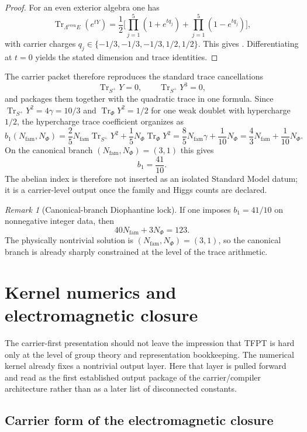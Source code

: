 \documentclass[11pt,a4paper]{article}
\theoremstyle{definition}
\theoremstyle{remark}
\newtheorem*{remark}{Remark}
\DeclareMathOperator{\tr}{Tr}
\newcommand{\bone}{b_1}
\begin{document}
\begin{proof}
For an even exterior algebra one has
\[
\tr_{\Lambda^{\mathrm{even}}E}(e^{tY})
=
\frac12\Big[\prod_{j=1}^5(1+e^{tq_j})+\prod_{j=1}^5(1-e^{tq_j})\Big],
\]
with carrier charges $q_j\in\{-1/3,-1/3,-1/3,1/2,1/2\}$. This gives . Differentiating at $t=0$ yields the stated dimension and trace identities.
\end{proof}

The carrier packet therefore reproduces the standard trace cancellations
\[
\tr_{S^+}Y=0,
\qquad
\tr_{S^+}Y^3=0,
\]
and packages them together with the quadratic trace in one formula. Since $\tr_{S^+}Y^2=4\gamma=10/3$ and $\tr_\Phi Y^2=1/2$ for one weak doublet with hypercharge $1/2$, the hypercharge trace coefficient organizes as
\begin{equation}
\label{eq:abelian-index}
\bone(N_{\mathrm{fam}},N_\Phi)
=
\frac25N_{\mathrm{fam}}\tr_{S^+}Y^2+\frac15N_\Phi\tr_\Phi Y^2
=
\frac85N_{\mathrm{fam}}\gamma+\frac1{10}N_\Phi
=
\frac43N_{\mathrm{fam}}+\frac1{10}N_\Phi.
\end{equation}
On the canonical branch $(N_{\mathrm{fam}},N_\Phi)=(3,1)$ this gives
\[
\bone=\frac{41}{10}.
\]
The abelian index is therefore not inserted as an isolated Standard Model datum; it is a carrier-level output once the family and Higgs counts are declared.

\begin{remark}[Canonical-branch Diophantine lock]
If one imposes $\bone=41/10$ on nonnegative integer data, then
\[
40N_{\mathrm{fam}}+3N_\Phi=123.
\]
The physically nontrivial solution is $(N_{\mathrm{fam}},N_\Phi)=(3,1)$, so the canonical branch is already sharply constrained at the level of the trace arithmetic.
\end{remark}

\section{Kernel numerics and electromagnetic closure}

The carrier-first presentation should not leave the impression that TFPT is hard only at the level of group theory and representation bookkeeping. The numerical kernel already fixes a nontrivial output layer. Here that layer is pulled forward and read as the first established output package of the carrier/compiler architecture rather than as a later list of disconnected constants.

\subsection{Carrier form of the electromagnetic closure}
\end{document}
